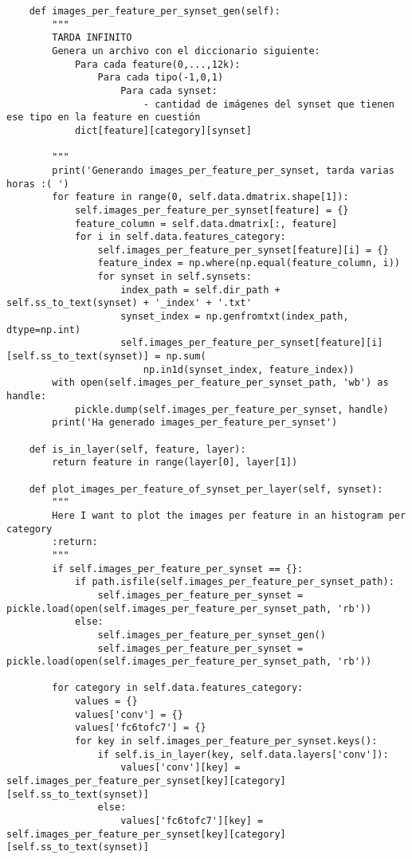 \documentclass[12,twoside]{TFG-GM}
\theoremstyle{definition}
\theoremstyle{remark}
\begin{document}
\begin{verbatim}
    def images_per_feature_per_synset_gen(self):
        """
        TARDA INFINITO
        Genera un archivo con el diccionario siguiente:
            Para cada feature(0,...,12k):
                Para cada tipo(-1,0,1)
                    Para cada synset:
                        - cantidad de imágenes del synset que tienen ese tipo en la feature en cuestión
            dict[feature][category][synset]

        """
        print('Generando images_per_feature_per_synset, tarda varias horas :( ')
        for feature in range(0, self.data.dmatrix.shape[1]):
            self.images_per_feature_per_synset[feature] = {}
            feature_column = self.data.dmatrix[:, feature]
            for i in self.data.features_category:
                self.images_per_feature_per_synset[feature][i] = {}
                feature_index = np.where(np.equal(feature_column, i))
                for synset in self.synsets:
                    index_path = self.dir_path + self.ss_to_text(synset) + '_index' + '.txt'
                    synset_index = np.genfromtxt(index_path, dtype=np.int)
                    self.images_per_feature_per_synset[feature][i][self.ss_to_text(synset)] = np.sum(
                        np.in1d(synset_index, feature_index))
        with open(self.images_per_feature_per_synset_path, 'wb') as handle:
            pickle.dump(self.images_per_feature_per_synset, handle)
        print('Ha generado images_per_feature_per_synset')

    def is_in_layer(self, feature, layer):
        return feature in range(layer[0], layer[1])

    def plot_images_per_feature_of_synset_per_layer(self, synset):
        """
        Here I want to plot the images per feature in an histogram per category
        :return:
        """
        if self.images_per_feature_per_synset == {}:
            if path.isfile(self.images_per_feature_per_synset_path):
                self.images_per_feature_per_synset = pickle.load(open(self.images_per_feature_per_synset_path, 'rb'))
            else:
                self.images_per_feature_per_synset_gen()
                self.images_per_feature_per_synset = pickle.load(open(self.images_per_feature_per_synset_path, 'rb'))

        for category in self.data.features_category:
            values = {}
            values['conv'] = {}
            values['fc6tofc7'] = {}
            for key in self.images_per_feature_per_synset.keys():
                if self.is_in_layer(key, self.data.layers['conv']):
                    values['conv'][key] = self.images_per_feature_per_synset[key][category][self.ss_to_text(synset)]
                else:
                    values['fc6tofc7'][key] = self.images_per_feature_per_synset[key][category][self.ss_to_text(synset)]


\end{verbatim}
\end{document}
